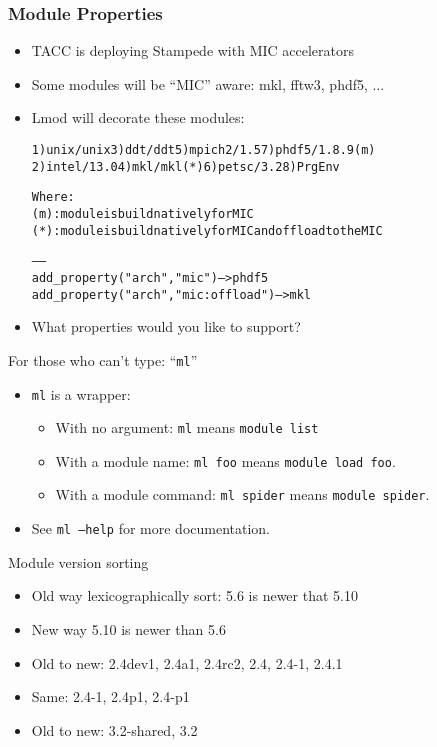 \documentclass{beamer}
\begin{document}
\begin{frame}[fragile]
    \frametitle{Module Properties}
  \begin{itemize}
    \item TACC is deploying Stampede with MIC accelerators
    \item Some modules will be ``MIC'' aware: mkl, fftw3, phdf5, ...
    \item Lmod will decorate these modules:
  {\tiny
    \begin{alltt}
  1) unix/unix     3) ddt/ddt       5) mpich2/1.5    7) {\color{blue}phdf5/1.8.9 (m)}
  2) intel/13.0    4) {\color{red}mkl/mkl (*)}   6) petsc/3.2     8) PrgEnv

  Where:
   {\color{blue}(m)}:  module is build natively for MIC
   {\color{red}(*)}:  module is build natively for MIC and offload to the MIC

   ------
   add_property("arch","mic")              -- > phdf5
   add_property("arch","mic:offload")      -- > mkl
    \end{alltt}
}
  \item What properties would you like to support?
  \end{itemize}
\end{frame}


\begin{frame}{For those who can't type: ``\texttt{ml}''}
  \begin{itemize}
    \item \texttt{ml} is a wrapper:
      \begin{itemize}
        \item With no argument: \texttt{ml} means \texttt{module list}
        \item With a module name: \texttt{ml foo} means \texttt{module
            load foo}.
        \item With a module command: \texttt{ml spider} means
          \texttt{module spider}.
      \end{itemize}
    \item See \texttt{ml --help} for more documentation.
  \end{itemize}
\end{frame}

\begin{frame}{Module version sorting}
  \begin{itemize}
    \item Old way lexicographically sort: 5.6 is newer that 5.10
    \item New way 5.10 is newer than 5.6
    \item Old to new: 2.4dev1, 2.4a1, 2.4rc2, 2.4, 2.4-1, 2.4.1
    \item Same: 2.4-1, 2.4p1, 2.4-p1
    \item Old to new: 3.2-shared, 3.2
  \end{itemize}
\end{frame}
\end{document}
